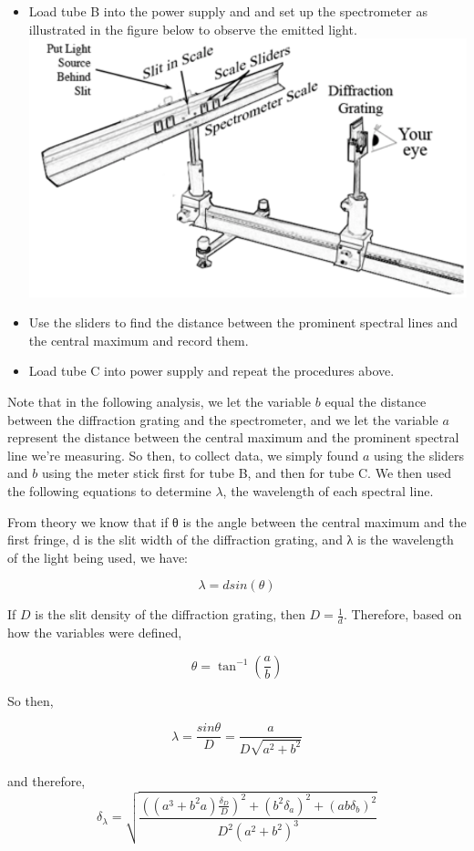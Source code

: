 \documentclass[11pt]{article}
\makeatletter
\def\maxwidth{\ifdim\Gin@nat@width>\linewidth\linewidth
    \else\Gin@nat@width\fi}
\let\Oldincludegraphics\includegraphics
\renewcommand{\includegraphics}[1]{\Oldincludegraphics[width=.8\maxwidth]{#1}}
\makeatother
\begin{document}
\begin{itemize}
\item
  Load tube B into the power supply and and set up the spectrometer as
  illustrated in the figure below to observe the emitted light.\\
  \includegraphics{setup.jpg}
\item
  Use the sliders to find the distance between the prominent spectral
  lines and the central maximum and record them.
\item
  Load tube C into power supply and repeat the procedures above.
\end{itemize}

Note that in the following analysis, we let the variable \(b\) equal the
distance between the diffraction grating and the spectrometer, and we
let the variable \(a\) represent the distance between the central
maximum and the prominent spectral line we're measuring. So then, to
collect data, we simply found \(a\) using the sliders and \(b\) using
the meter stick first for tube B, and then for tube C. We then used the
following equations to determine \(\lambda\), the wavelength of each
spectral line.

From theory we know that if θ is the angle between the central maximum
and the first fringe, d is the slit width of the diffraction grating,
and λ is the wavelength of the light being used, we have:

\[\lambda = dsin(\theta)\]

If \(D\) is the slit density of the diffraction grating, then
\(D = \frac{1}{d}\). Therefore, based on how the variables were defined,

\[ \theta = \tan ^{-1}\left(\frac{a}{b}\right)\]

So then,

\[\lambda = \dfrac{sin\theta}{D} = \dfrac{a}{D\sqrt{a^{2}+b^{2}}}\]\\
and therefore,\\
\[\delta_{\lambda} = \sqrt{\dfrac{((a^{3} + b^{2}a)\frac{\delta_{D}}{D})^{2} + (b^{2}\delta_{a})^{2} + (ab\delta_{b})^{2}}{D^{2}(a^{2}+b^{2})^{3}}}\]
\end{document}
